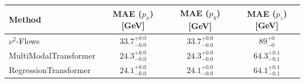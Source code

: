     \begin{tabular}{lccc}
        \toprule
        Method & MAE ($p_x$) [GeV] & MAE ($p_y$) [GeV] & MAE ($p_z$) [GeV] \\
        \midrule
        $\nu^2$-Flows & $33.7_{-0.0}^{+0.0}$ & $33.7_{-0.0}^{+0.0}$ & $89_{-0}^{+0}$ \\
        MultiModalTransformer & $24.3_{-0.0}^{+0.0}$ & $24.3_{-0.0}^{+0.0}$ & $64.3_{-0.1}^{+0.1}$ \\
        RegressionTransformer & $24.1_{-0.0}^{+0.0}$ & $24.1_{-0.0}^{+0.0}$ & $64.1_{-0.1}^{+0.1}$ \\
        \bottomrule
    \end{tabular}